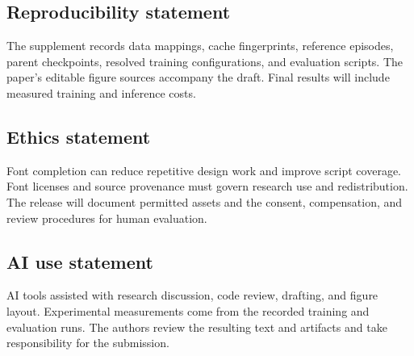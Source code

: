 \documentclass{article}
\begin{document}
\subsection*{Reproducibility statement}
The supplement records data mappings, cache fingerprints, reference episodes, parent checkpoints, resolved training configurations, and evaluation scripts.
The paper's editable figure sources accompany the draft.
Final results will include measured training and inference costs.

\subsection*{Ethics statement}
Font completion can reduce repetitive design work and improve script coverage.
Font licenses and source provenance must govern research use and redistribution.
The release will document permitted assets and the consent, compensation, and review procedures for human evaluation.

\subsection*{AI use statement}
AI tools assisted with research discussion, code review, drafting, and figure layout.
Experimental measurements come from the recorded training and evaluation runs.
The authors review the resulting text and artifacts and take responsibility for the submission.



\appendix
\end{document}
